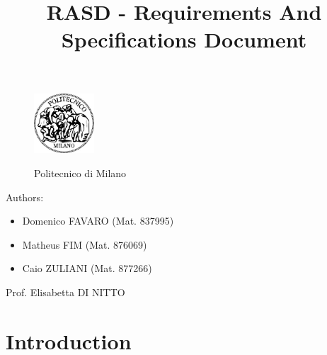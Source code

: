 \documentclass[a4paper]{article}
\title{RASD - Requirements And Specifications Document}
\begin{document}
\begin{titlepage}
\begin{figure}
\centering
\includegraphics[width=0.2\textwidth]{polimi.jpg}
\par
\LARGE Politecnico di Milano
\end{figure}


\maketitle
\raggedright
Authors:
\begin{itemize}
	\item Domenico FAVARO (Mat. 837995)
        	\item Matheus FIM (Mat. 876069)
	\item Caio ZULIANI (Mat. 877266)	
\end{itemize}
\raggedleft
Prof. Elisabetta DI NITTO
\thispagestyle{empty}
\end{titlepage}

\tableofcontents
\newpage
 
\section{Introduction}
\end{document}
